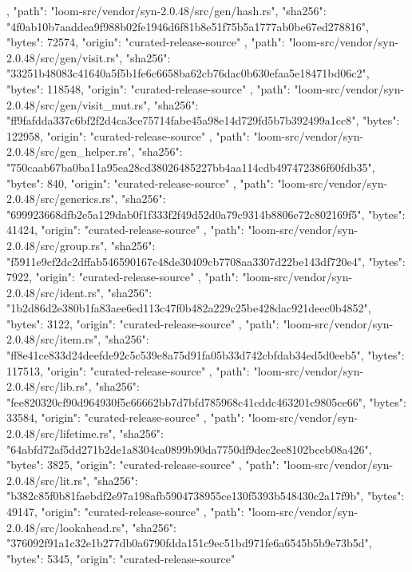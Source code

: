 {{    },
    {
      "path": "loom-src/vendor/syn-2.0.48/src/gen/hash.rs",
      "sha256": "4f0ab10b7aaddea9f988b02fe1946d6f81b8e51f75b5a1777ab0be67ed278816",
      "bytes": 72574,
      "origin": "curated-release-source"
    },
    {
      "path": "loom-src/vendor/syn-2.0.48/src/gen/visit.rs",
      "sha256": "33251b48083c41640a5f5b1fe6c6658ba62cb76dac0b630efaa5e18471bd06c2",
      "bytes": 118548,
      "origin": "curated-release-source"
    },
    {
      "path": "loom-src/vendor/syn-2.0.48/src/gen/visit_mut.rs",
      "sha256": "ff9fafdda337c6bf2f2d4ca3ce75714fabe45a98e14d729fd5b7b392499a1cc8",
      "bytes": 122958,
      "origin": "curated-release-source"
    },
    {
      "path": "loom-src/vendor/syn-2.0.48/src/gen_helper.rs",
      "sha256": "750caab67ba0ba11a95ea28cd38026485227bb4aa114cdb497472386f60fdb35",
      "bytes": 840,
      "origin": "curated-release-source"
    },
    {
      "path": "loom-src/vendor/syn-2.0.48/src/generics.rs",
      "sha256": "699923668dfb2e5a129dab0f1f333f2f49d52d0a79c9314b8806e72c802169f5",
      "bytes": 41424,
      "origin": "curated-release-source"
    },
    {
      "path": "loom-src/vendor/syn-2.0.48/src/group.rs",
      "sha256": "f5911e9cf2dc2dffab546590167c48de30409cb7708aa3307d22be143df720e4",
      "bytes": 7922,
      "origin": "curated-release-source"
    },
    {
      "path": "loom-src/vendor/syn-2.0.48/src/ident.rs",
      "sha256": "1b2d86d2e380b1fa83aee6ed113c47f0b482a229c25be428dac921deec0b4852",
      "bytes": 3122,
      "origin": "curated-release-source"
    },
    {
      "path": "loom-src/vendor/syn-2.0.48/src/item.rs",
      "sha256": "ff8e41ce833d24deefde92c5c539e8a75d91fa05b33d742cbfdab34ed5d0eeb5",
      "bytes": 117513,
      "origin": "curated-release-source"
    },
    {
      "path": "loom-src/vendor/syn-2.0.48/src/lib.rs",
      "sha256": "fee820320cf90d964930f5c66662bb7d7bfd785968c41cddc463201c9805ce66",
      "bytes": 33584,
      "origin": "curated-release-source"
    },
    {
      "path": "loom-src/vendor/syn-2.0.48/src/lifetime.rs",
      "sha256": "64abfd72af5dd271b2de1a8304ca0899b90da7750df9dec2ee8102bceb08a426",
      "bytes": 3825,
      "origin": "curated-release-source"
    },
    {
      "path": "loom-src/vendor/syn-2.0.48/src/lit.rs",
      "sha256": "b382c85f0b81faebdf2e97a198afb5904738955ce130f5393b548430c2a17f9b",
      "bytes": 49147,
      "origin": "curated-release-source"
    },
    {
      "path": "loom-src/vendor/syn-2.0.48/src/lookahead.rs",
      "sha256": "376092f91a1c32e1b277db0a6790fdda151c9ec51bd971fe6a6545b5b9e73b5d",
      "bytes": 5345,
      "origin": "curated-release-source"
}}
